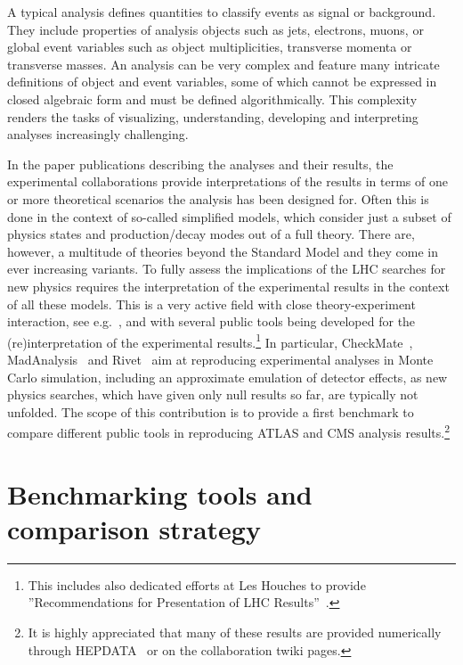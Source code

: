 \documentclass[11pt]{cernrep}
\begin{document}
A typical analysis defines quantities to classify events as signal
or background. They include properties of analysis objects such as
jets, electrons, muons, or global event variables such as object multiplicities,
transverse momenta or transverse masses.
An analysis can be very complex and feature many intricate definitions of object and event
variables, some of which cannot be expressed in closed algebraic form and must be defined
algorithmically. This complexity renders the tasks of visualizing, understanding, developing and
interpreting analyses increasingly challenging.

In the paper publications describing the analyses and their results, the experimental collaborations
provide interpretations of the results in terms of one or more theoretical scenarios the analysis has been designed for. 
Often this is done in the context of so-called simplified models, which consider just a subset of physics states and 
production/decay modes out of a full theory.   
There are, however, a multitude of theories beyond the Standard Model and they come in ever increasing variants. 
To fully assess the implications of the LHC searches for new physics requires the interpretation of the experimental results 
in the context of all these models. This is a very active field with close theory-experiment interaction, 
see e.g.~\cite{reinterpretationforum}, and with several public tools being developed for the (re)interpretation of the 
experimental results.\footnote{This includes also dedicated efforts at Les Houches to provide ''Recommendations for Presentation of LHC Results''~\cite{Brooijmans:2012yi,Kraml:2012sg,Brooijmans:2016vro}.} 
In particular,  
CheckMate~\cite{Drees:2013wra,Cacciari:2005hq},
MadAnalysis~\cite{Conte:2012fm,Conte:2014zja,Dumont:2014tja}
and Rivet~\cite{Waugh:2006ip,Buckley:2010ar} 
aim at reproducing experimental analyses in Monte Carlo simulation, including an approximate emulation of detector effects, 
as new physics searches, which have given only null results so far, are typically not unfolded.  
The scope of this contribution is to provide a first benchmark to compare different public tools in reproducing ATLAS and CMS analysis results.\footnote{It is highly  appreciated that many of these results are provided numerically through HEPDATA~\cite{Maguire:2017ypu} or on the collaboration twiki pages.}

\section{Benchmarking tools and comparison strategy}
\end{document}
